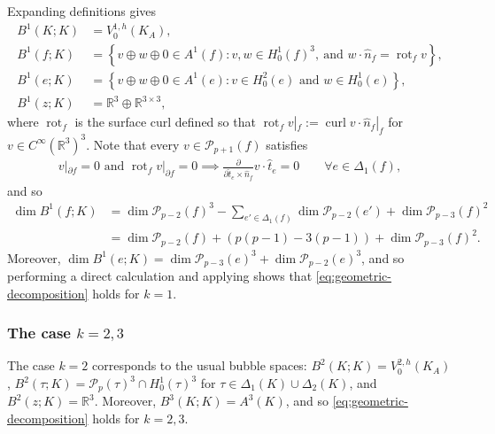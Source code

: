 \documentclass{mcom-l}
\theoremstyle{definition}
\theoremstyle{remark}
\numberwithin{equation}{section}
\newcommand{\unitvec}[1]{\hat{#1}}
\DeclareMathOperator{\RT}{RT}
\DeclareMathOperator{\curl}{curl}
\DeclareMathOperator{\rot}{rot}
\begin{document}
Expanding definitions gives
\begin{align*}
	B^1(K; K) &=  V_0^{1, h}(K_A), \\
	B^1(f; K) &= \left\{ v \oplus w \oplus 0 \in A^1(f) 
	: v,w \in H^1_0(f)^3, \
	\text{and }
	w \cdot \unitvec{n}_f = \rot_f v
	\right\}, \\
	B^1(e; K) &= \left\{ 
	v \oplus w \oplus 
	0 
	\in A^1(e) 
	: v \in H^2_0(e) \text{ and } w \in H^1_0(e) \right\}, \\
	B^1(z; K) &= \mathbb{R}^3 \oplus \mathbb{R}^{3 \times 3},
\end{align*}
where $\rot_f$ is the surface curl defined so that 
$\rot_f v|_f := \curl v \cdot \unitvec{n}_f|_{f}$ for
$v \in C^{\infty}(\mathbb{R}^3)^3$.
Note that every $v \in \mathcal{P}_{p+1}(f)$ satisfies
\begin{align*}
	v|_{\partial f} = 0
	\text{ and } \rot_f v|_{\partial f} = 0 
	\implies
	\frac{\partial }{\partial \unitvec{t}_e \times \unitvec{n}_f} 
	v \cdot \unitvec{t}_{e} = 0 \qquad \forall e \in \Delta_1(f), 
\end{align*}
and so 
\begin{align*}
	\dim B^1(f; K) &= \dim \mathcal{P}_{p-2}(f)^3 
	-  \sum_{e' \in \Delta_1(f)} \dim \mathcal{P}_{p-2}(e') 
	+ \dim \mathcal{P}_{p-3}(f)^2  \\
	&= \dim \mathcal{P}_{p-2}(f) + \left(  p(p-1) - 
	3(p-1) \right) + \dim \mathcal{P}_{p-3}(f)^2.
\end{align*}
Moreover, $\dim B^1(e; K) = \dim \mathcal{P}_{p-3}(e)^3 
+ \dim \mathcal{P}_{p-2}(e)^3$,
and so performing a direct
calculation and applying \cite[Lemma 4.11]{FuGuzmanNeilan20} 
shows that \cref{eq:geometric-decomposition} holds for $k=1$.

\subsubsection{The case $k=2,3$}

The case $k=2$ corresponds to the usual bubble spaces:
$B^2(K; K) = V^{2, h}_0(K_A)$,
$B^2(\tau; K) = \mathcal{P}_{p}(\tau)^3 \cap H^1_0(\tau)^3$
for $\tau \in \Delta_1(K) \cup \Delta_2(K)$,
and $B^2(z; K) = \mathbb{R}^3$. Moreover, 
$B^3(K; K) = A^3(K)$, and so \cref{eq:geometric-decomposition}
holds for $k=2,3$.
\end{document}
